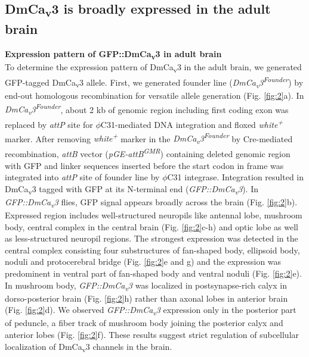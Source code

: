 \subsection*{DmCa\textsubscript{v}3 is broadly expressed in the adult brain}

\textbf{Expression pattern of GFP::DmCa\textsubscript{v}3 in adult brain}\\
To determine the expression pattern of DmCa\textsubscript{v}3 in the adult brain, we generated GFP-tagged DmCa\textsubscript{v}3 allele.
First, we generated founder line (\emph{DmCa\textsubscript{v}3\textsuperscript{Founder}})  by end-out homologous recombination for versatile allele generation\cite{Huang:2009ei} (Fig. \ref{fig:2}a).
 In \emph{DmCa\textsubscript{v}3\textsuperscript{Founder}}, about 2 kb of genomic  region including first coding exon was replaced by \emph{attP} site for  $\phi$C31-mediated DNA integration  and floxed \emph{white\textsuperscript{+}} marker. 
After removing \emph{white\textsuperscript{+}} marker in the \emph{DmCa\textsubscript{v}3\textsuperscript{Founder}} by Cre-mediated recombination, \emph{attB} vector (\emph{pGE-attB\textsuperscript{GMR}}) containing deleted genomic region with GFP and linker sequences inserted before the start codon in frame  was integrated into \emph{attP} site of founder line by $\phi$C31 integrase. 
Integration resulted in DmCa\textsubscript{v}3 tagged with GFP at its N-terminal end (\emph{GFP::DmCa\textsubscript{v}3}). 
In \emph{GFP::DmCa\textsubscript{v}3} flies, GFP signal appears broadly across the brain (Fig. \ref{fig:2}b).
Expressed region includes well-structured neuropils like antennal lobe, mushroom body, central complex in the central brain (Fig. \ref{fig:2}c-h) and optic lobe as well as less-structured neuropil regions.
The strongest expression was detected in the central complex consisting four substructures of fan-shaped body, ellipsoid body, noduli and protocerebral bridge (Fig. \ref{fig:2}e and g) and the expression was predominent in ventral part of fan-shaped body and ventral noduli (Fig. \ref{fig:2}e). 
In mushroom body, \emph{GFP::DmCa\textsubscript{v}3} was localized in postsynapse-rich calyx in dorso-posterior brain (Fig. \ref{fig:2}h) rather than axonal lobes in anterior brain (Fig. \ref{fig:2}d).
We observed \emph{GFP::DmCa\textsubscript{v}3} expression only in the posterior part of peduncle, a fiber track of mushroom body joining the posterior calyx and anterior lobes (Fig. \ref{fig:2}f).
These results suggest strict regulation of subcellular localization of DmCa\textsubscript{v}3 channels in the brain.


